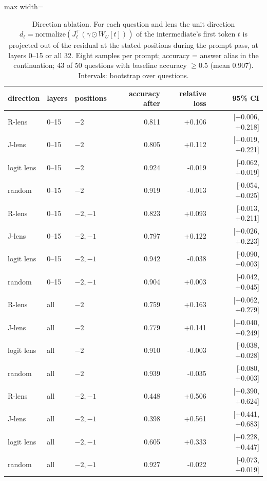 \begin{table}[t]
\centering
\footnotesize
\caption{Direction ablation. For each question and lens the unit direction $d_\ell = \mathrm{normalize}(J_\ell^\top(\gamma\odot W_U[t]))$ of the intermediate's first token $t$ is projected out of the residual at the stated positions during the prompt pass, at layers 0--15 or all 32. Eight samples per prompt; accuracy = answer alias in the continuation; 43 of 50 questions with baseline accuracy $\ge 0.5$ (mean 0.907). Intervals: bootstrap over questions.}
\label{tab:rlens_ablation}
\begin{adjustbox}{max width=\textwidth}
\begin{tabular}{lllrrr}
\toprule
direction & layers & positions & accuracy after & relative loss & 95\% CI \\
\midrule
R-lens & 0--15 & $-2$ & 0.811 & +0.106 & [+0.006, +0.218] \\
J-lens & 0--15 & $-2$ & 0.805 & +0.112 & [+0.019, +0.221] \\
logit lens & 0--15 & $-2$ & 0.924 & -0.019 & [-0.062, +0.019] \\
random & 0--15 & $-2$ & 0.919 & -0.013 & [-0.054, +0.025] \\
\midrule
R-lens & 0--15 & $-2,-1$ & 0.823 & +0.093 & [-0.013, +0.211] \\
J-lens & 0--15 & $-2,-1$ & 0.797 & +0.122 & [+0.026, +0.223] \\
logit lens & 0--15 & $-2,-1$ & 0.942 & -0.038 & [-0.090, +0.003] \\
random & 0--15 & $-2,-1$ & 0.904 & +0.003 & [-0.042, +0.045] \\
\midrule
R-lens & all & $-2$ & 0.759 & +0.163 & [+0.062, +0.279] \\
J-lens & all & $-2$ & 0.779 & +0.141 & [+0.040, +0.249] \\
logit lens & all & $-2$ & 0.910 & -0.003 & [-0.038, +0.028] \\
random & all & $-2$ & 0.939 & -0.035 & [-0.080, +0.003] \\
\midrule
R-lens & all & $-2,-1$ & 0.448 & +0.506 & [+0.390, +0.624] \\
J-lens & all & $-2,-1$ & 0.398 & +0.561 & [+0.441, +0.683] \\
logit lens & all & $-2,-1$ & 0.605 & +0.333 & [+0.228, +0.447] \\
random & all & $-2,-1$ & 0.927 & -0.022 & [-0.073, +0.019] \\
\bottomrule
\end{tabular}
\end{adjustbox}
\end{table}
